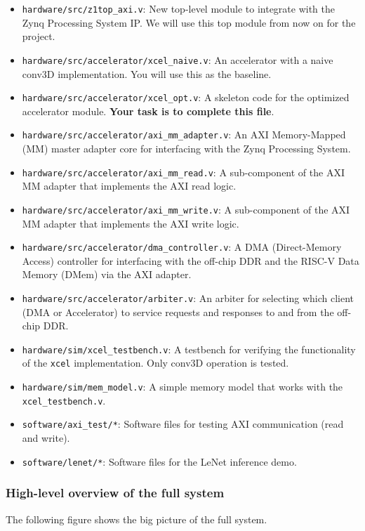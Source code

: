 \documentclass[11pt]{article}
\begin{document}
\begin{itemize}
\item \verb|hardware/src/z1top_axi.v|: New top-level module to integrate with the Zynq Processing System IP. We will use this top module from now on for the project.
\item \verb|hardware/src/accelerator/xcel_naive.v|: An accelerator with a naive conv3D implementation. You will use this as the baseline.
\item \verb|hardware/src/accelerator/xcel_opt.v|: A skeleton code for the optimized accelerator module. \textbf{Your task is to complete this file}.
\item \verb|hardware/src/accelerator/axi_mm_adapter.v|: An AXI Memory-Mapped (MM) master adapter core for interfacing with the Zynq Processing System.
\item \verb|hardware/src/accelerator/axi_mm_read.v|: A sub-component of the AXI MM adapter that implements the AXI read logic.
\item \verb|hardware/src/accelerator/axi_mm_write.v|: A sub-component of the AXI MM adapter that implements the AXI write logic.
\item \verb|hardware/src/accelerator/dma_controller.v|: A DMA (Direct-Memory Access) controller for interfacing with the off-chip DDR and the RISC-V Data Memory (DMem) via the AXI adapter.
\item \verb|hardware/src/accelerator/arbiter.v|: An arbiter for selecting which client (DMA or Accelerator) to service requests and responses to and from the off-chip DDR.
\item \verb|hardware/sim/xcel_testbench.v|: A testbench for verifying the functionality of the \texttt{xcel} implementation. Only conv3D operation is tested.
\item \verb|hardware/sim/mem_model.v|: A simple memory model that works with the \verb|xcel_testbench.v|.
\item \verb|software/axi_test/*|: Software files for testing AXI communication (read and write).
\item \verb|software/lenet/*|: Software files for the LeNet inference demo.
\end{itemize}

\subsubsection{High-level overview of the full system}
The following figure shows the big picture of the full system.
\end{document}
